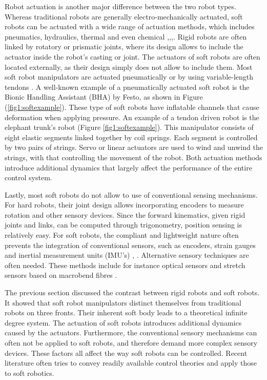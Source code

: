 Robot actuation is another major difference between the two robot types. Whereas traditional robots are generally electro-mechanically actuated, soft robots can be actuated with a wide range of actuation methods, which includes pneumatics, hydraulics, thermal and even chemical \cite{BHA},\cite{marchese2014},\cite{kang2019programmable},\cite{shepherd2013using}. Rigid robots are often linked by rotatory or prismatic joints, where its design allows to include the actuator inside the robot's casting or joint. The actuators of soft robots are often located externally, as their design simply does not allow to include them. Most soft robot manipulators are actuated pneumatically or by using variable-length tendons \cite{Rus2015}. A well-known example of a pneumatically actuated soft robot is the Bionic Handling Assistant (BHA) by Festo, as shown in Figure (\ref{fig1:softexample}). These type of soft robots have inflatable channels that cause deformation when applying pressure. An example of a tendon driven robot is the elephant trunk's robot \cite{cieslak1999elephant} (Figure \ref{fig1:softexample}). This manipulator consists of eight elastic segments linked together by coil springs. Each segment is controlled by two pairs of strings. Servo or linear actuators are used to wind and unwind the strings, with that controlling the movement of the robot. Both actuation methods introduce additional dynamics that largely affect the performance of the entire control system. 

Lastly, most soft robots do not allow to use of conventional sensing mechanisms. For hard robots, their joint design allows incorporating encoders to measure rotation and other sensory devices. Since the forward kinematics, given rigid joints and links, can be computed through trigonometry, position sensing is relatively easy. For soft robots, the compliant and lightweight nature often prevents the integration of conventional sensors, such as encoders, strain gauges and inertial measurement units (IMU's) \cite{Rus2015}, \cite{Lee2017}. Alternative sensory techniques are often needed. These methods include for instance optical sensors and stretch sensors based on macrobend fibres \cite{Sareh2015}.


The previous section discussed the contrast between rigid robots and soft robots. It showed that soft robot manipulators distinct themselves from traditional robots on three fronts. Their inherent soft body leads to a theoretical infinite degree system. The actuation of soft robots introduces additional dynamics caused by the actuators. Furthermore, the conventional sensory mechanisms can often not be applied to soft robots, and therefore demand more complex sensory devices. These factors all affect the way soft robots can be controlled. Recent literature often tries to convey readily available control theories and apply those to soft robotics.

